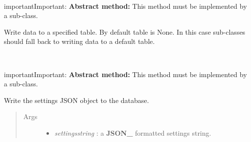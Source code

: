 \documentclass[letterpaper,10pt,english]{sphinxmanual}
\begin{document}
\begin{fulllineitems}
\begin{fulllineitems}
\begin{quote}
\begin{description}
\begin{itemize}
\end{itemize}

\end{description}\end{quote}

\end{fulllineitems}


\begin{fulllineitems}
\label{api-doc/mosaic.meta:mosaic.metaMDIO.metaMDIO.writeRecord}~
\begin{notice}{important}{Important:}
\textbf{Abstract method:} This method must be implemented by a sub-class.
\end{notice}

Write data to a specified table. By default table 
is None. In this case sub-classes should fall back 
to writing data to a default table.

\end{fulllineitems}


\begin{fulllineitems}
\label{api-doc/mosaic.meta:mosaic.metaMDIO.metaMDIO.writeSettings}~
\begin{notice}{important}{Important:}
\textbf{Abstract method:} This method must be implemented by a sub-class.
\end{notice}

Write the settings JSON object to the database.
\begin{quote}\begin{description}
\item[{Args}] \leavevmode\begin{itemize}
\item {} 
\emph{settingsstring} : a {\color{red}\bfseries{}JSON\_} formatted settings string.

\end{itemize}

\end{description}\end{quote}

\end{fulllineitems}


\end{fulllineitems}
\end{document}
